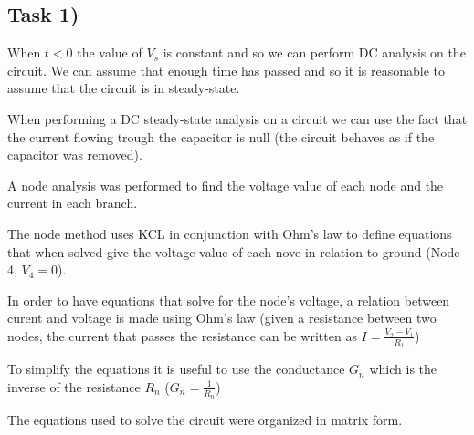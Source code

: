 \subsection{Task 1)}
\label{subsec:task1_a}

When $t<0$ the value of $V_s$ is constant and so we can perform DC analysis on the circuit. We can assume that enough time has passed and so it is reasonable to assume that the circuit is in steady-state.

When performing a DC steady-state analysis on a circuit we can use the fact that the current flowing trough the capacitor is null (the circuit behaves as if the capacitor was removed).

A node analysis was performed to find the voltage value of each node and the current in each branch.

The node method uses KCL in conjunction with Ohm’s law to define equations that when solved give the voltage value 
of each nove in relation to ground (Node 4, $V_4 = 0$). 

In order to have equations that solve for the node’s voltage, a relation between curent and voltage is made using 
Ohm’s law (given a resistance between two nodes, the current that passes the resistance can be written as 
$I=\frac{V_2-V_1}{R_1}$)

To simplify the equations it is useful to use the conductance $G_n$ which is the inverse of the resistance $R_n$ 
($G_n=\frac{1}{R_n}$)

The equations used to solve the circuit were organized in matrix form.

